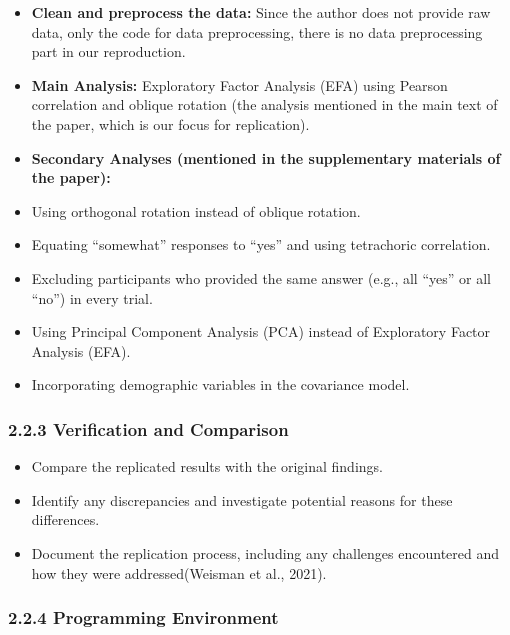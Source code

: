 \documentclass[
  man]{apa6}
\providecommand{\tightlist}{%
  \setlength{\itemsep}{0pt}\setlength{\parskip}{0pt}}
\begin{document}
\begin{itemize}
\item
  \textbf{Clean and preprocess the data:} Since the author does not provide
  raw data, only the code for data preprocessing, there is no data
  preprocessing part in our reproduction.
\item
  \textbf{Main Analysis:} Exploratory Factor Analysis (EFA) using Pearson
  correlation and oblique rotation (the analysis mentioned in the main
  text of the paper, which is our focus for replication).
\item
  \textbf{Secondary Analyses (mentioned in the supplementary materials of
  the paper):}
\item
  Using orthogonal rotation instead of oblique rotation.
\item
  Equating ``somewhat'' responses to ``yes'' and using tetrachoric
  correlation.
\item
  Excluding participants who provided the same answer (e.g., all ``yes''
  or all ``no'') in every trial.
\item
  Using Principal Component Analysis (PCA) instead of Exploratory
  Factor Analysis (EFA).
\item
  Incorporating demographic variables in the covariance model.
\end{itemize}

\hypertarget{verification-and-comparison}{%
\subsubsection{2.2.3 Verification and Comparison}\label{verification-and-comparison}}

\begin{itemize}
\tightlist
\item
  Compare the replicated results with the original findings.
\item
  Identify any discrepancies and investigate potential reasons for
  these differences.
\item
  Document the replication process, including any challenges
  encountered and how they were addressed(Weisman et al., 2021).
\end{itemize}

\hypertarget{programming-environment}{%
\subsubsection{2.2.4 Programming Environment}\label{programming-environment}}
\end{document}
